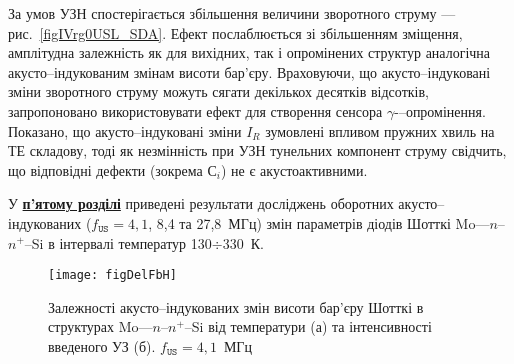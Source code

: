 


За умов УЗН спостерігається збільшення величини зворотного струму --- рис.~\ref{figIVrg0USL_SDA}.
Ефект послаблюється зі збільшенням зміщення, амплітудна залежність як для вихідних, так і
опромінених структур аналогічна акусто--індукованим змінам висоти бар'єру.
Враховуючи, що акусто--індуковані зміни зворотного струму можуть сягати декількох десятків відсотків,
запропоновано використовувати ефект для створення сенсора $\gamma$-–опромінення.
Показано, що акусто--індуковані зміни $I_R$ зумовлені впливом пружних хвиль на ТЕ складову,
тоді як незмінність при УЗН тунельних компонент струму свідчить,
що відповідні дефекти (зокрема С$_i$) не є акустоактивними.


У  \underline{\textbf{п'ятому розділі}} приведені результати досліджень
оборотних акусто--індукованих ($f_\mathtt{US}=4,1$, 8,4 та 27,8~МГц) змін
параметрів діодів Шотткі Mo---$n$--$n^+$--Si в інтервалі температур 130$\div$330~К.


\begin{SCfigure}[1.0][b]
\texttt{[image: figDelFbH]}
\caption{\label{figDelFbH}
Залежності акусто--індукованих змін висоти бар'єру Шотткі в структурах Mo---$n$--$n^+$--Si від температури (а)
та інтенсивності введеного УЗ (б).
$f_\mathtt{US}=4,1$~МГц
}%
\end{SCfigure}

